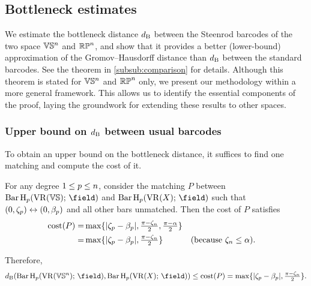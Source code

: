 
\subsection{Bottleneck estimates}\label{prop:db estimate}

We estimate the bottleneck distance $d_{\mathrm{B}}$ between the Steenrod barcodes of the two space $\mathbb{V}\mathbb{S}^n$ and $\mathbb{RP}^n$, and show that it provides a better (lower-bound) approximation of the Gromov--Hausdorff distance than $d_{\mathrm{B}}$ between the standard barcodes.
See the theorem in \cref{subsub:comparison} for details.
Although this theorem is stated for $\mathbb{V}\mathbb{S}^n$ and $\mathbb{RP}^n$ only, we present our methodology within a more general framework.
This allows us to identify the essential components of the proof, laying the groundwork for extending these results to other spaces.

\subsubsection{Upper bound on $d_{\mathrm{B}}$ between usual barcodes}
\label{subsub:db_upper_bound}

To obtain an upper bound on the bottleneck distance, it suffices to find one matching and compute the cost of it. 

For any degree $1 \leq p \leq n$, consider the matching $P$ between $\Hbarc[\field]{\degp}{\VS}$ and $\Hbarc[\field]{\degp}{X}$ such that $(0,\zeta_p ) \leftrightarrow (0, \beta_p )$ and all other bars unmatched. 
Then the cost of $P$ satisfies
\begin{align*}
    \mathrm{cost}(P) 
    = & \max\{|\zeta_p  - \beta_p |, \tfrac{\pi - \zeta_n}{2}, \tfrac{\pi - \alpha}{2}\} \\
    = & \max\{|\zeta_p  - \beta_p |, \tfrac{\pi - \zeta_n}{2}\} && \mbox{(because $\zeta_n \leq \alpha$)}.
\end{align*}

Therefore, 
\begin{equation}\label{eq:db_usual_upper_bound}
    \db(\Hbarc[\field]{\degp}{\VS^n}, \Hbarc[\field]{\degp}{X})
    \leq \cost(P) 
    = \max\{|\zeta_\degp  - \beta_\degp |, \tfrac{\pi - \zeta_n}{2}\}.
\end{equation}


